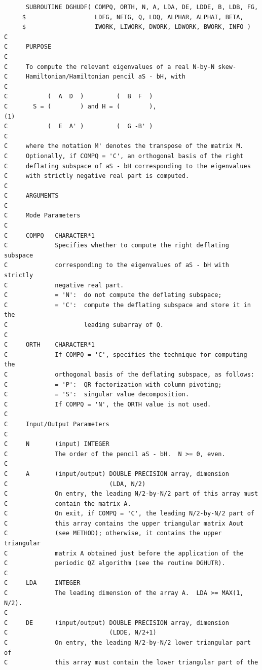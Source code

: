 \documentclass[a4paper,10pt]{article}
\begin{document}
\begin{verbatim}
      SUBROUTINE DGHUDF( COMPQ, ORTH, N, A, LDA, DE, LDDE, B, LDB, FG,
     $                   LDFG, NEIG, Q, LDQ, ALPHAR, ALPHAI, BETA,
     $                   IWORK, LIWORK, DWORK, LDWORK, BWORK, INFO )
C
C     PURPOSE
C
C     To compute the relevant eigenvalues of a real N-by-N skew-
C     Hamiltonian/Hamiltonian pencil aS - bH, with
C
C           (  A  D  )         (  B  F  )
C       S = (        ) and H = (        ),                           (1)
C           (  E  A' )         (  G -B' )
C
C     where the notation M' denotes the transpose of the matrix M.
C     Optionally, if COMPQ = 'C', an orthogonal basis of the right
C     deflating subspace of aS - bH corresponding to the eigenvalues
C     with strictly negative real part is computed.
C
C     ARGUMENTS
C
C     Mode Parameters
C
C     COMPQ   CHARACTER*1
C             Specifies whether to compute the right deflating subspace
C             corresponding to the eigenvalues of aS - bH with strictly
C             negative real part.
C             = 'N':  do not compute the deflating subspace;
C             = 'C':  compute the deflating subspace and store it in the
C                     leading subarray of Q.
C
C     ORTH    CHARACTER*1
C             If COMPQ = 'C', specifies the technique for computing the
C             orthogonal basis of the deflating subspace, as follows:
C             = 'P':  QR factorization with column pivoting;
C             = 'S':  singular value decomposition.
C             If COMPQ = 'N', the ORTH value is not used.
C
C     Input/Output Parameters
C
C     N       (input) INTEGER
C             The order of the pencil aS - bH.  N >= 0, even.
C
C     A       (input/output) DOUBLE PRECISION array, dimension
C                            (LDA, N/2)
C             On entry, the leading N/2-by-N/2 part of this array must
C             contain the matrix A.
C             On exit, if COMPQ = 'C', the leading N/2-by-N/2 part of
C             this array contains the upper triangular matrix Aout
C             (see METHOD); otherwise, it contains the upper triangular
C             matrix A obtained just before the application of the
C             periodic QZ algorithm (see the routine DGHUTR).
C
C     LDA     INTEGER
C             The leading dimension of the array A.  LDA >= MAX(1, N/2).
C
C     DE      (input/output) DOUBLE PRECISION array, dimension
C                            (LDDE, N/2+1)
C             On entry, the leading N/2-by-N/2 lower triangular part of
C             this array must contain the lower triangular part of the

\end{verbatim}
\end{document}
